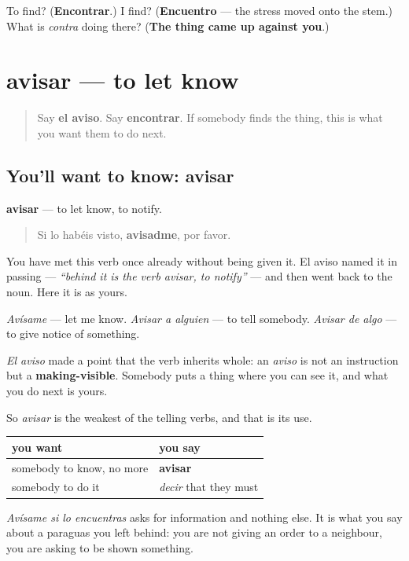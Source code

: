 \begin{tcolorbox}[breakable,colback=teal!4,colframe=teal!35!black,title={Before you move on}]
To find? (\textbf{Encontrar}.) I find? (\textbf{Encuentro} — the stress moved onto the stem.) What is \emph{contra} doing there? (\textbf{The thing came up against you}.)
\end{tcolorbox}
\section[avisar]{avisar — to let know}

\label{lesson:ES-C470-avisar}



\begin{quote}
Say \textbf{el aviso}. Say \textbf{encontrar}. If somebody finds the thing, this is what you want them to do next.
\end{quote}

\subsection*{You'll want to know: avisar}
\textbf{avisar} — to let know, to notify.

\begin{quote}
Si lo habéis visto, \textbf{avisadme}, por favor.
\end{quote}

You have met this verb once already without being given it. El aviso named it in passing — \emph{\textquotedblleft{}behind it is the verb avisar, to notify\textquotedblright{}} — and then went back to the noun. Here it is as yours.

\emph{Avísame} — let me know. \emph{Avisar a alguien} — to tell somebody. \emph{Avisar de algo} — to give notice of something.

\begin{grammarlens}[title={Grammar Lens: it shows, it does not order}]
\emph{El aviso} made a point that the verb inherits whole: an \emph{aviso} is not an instruction but a \textbf{making-visible}. Somebody puts a thing where you can see it, and what you do next is yours.

So \emph{avisar} is the weakest of the telling verbs, and that is its use.

\noindent
\begin{tabularx}{\linewidth}{@{}>{\raggedright\arraybackslash}X>{\raggedright\arraybackslash}X@{}}
\toprule
\textbf{you want} & \textbf{you say} \\
\midrule
somebody to know, no more & \textbf{avisar} \\
somebody to do it & \emph{decir} that they must \\
\bottomrule
\end{tabularx}

\emph{Avísame si lo encuentras} asks for information and nothing else. It is what you say about a paraguas you left behind: you are not giving an order to a neighbour, you are asking to be shown something.
\end{grammarlens}

